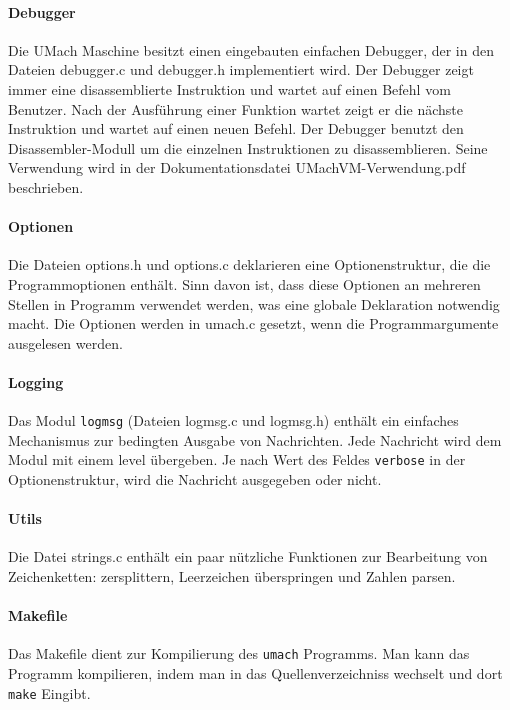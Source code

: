 \paragraph{Debugger}
Die UMach Maschine besitzt einen eingebauten einfachen Debugger, der in den
Dateien debugger.c und debugger.h implementiert wird. Der Debugger zeigt immer
eine disassemblierte Instruktion und wartet auf einen Befehl vom Benutzer. Nach
der Ausführung einer Funktion wartet zeigt er die nächste Instruktion und
wartet auf einen neuen Befehl. Der Debugger benutzt den Disassembler-Modull um
die einzelnen Instruktionen zu disassemblieren. Seine Verwendung wird in der
Dokumentationsdatei UMachVM-Verwendung.pdf beschrieben.

\paragraph{Optionen}
Die Dateien options.h und options.c deklarieren eine Optionenstruktur, die die
Programmoptionen enthält. Sinn davon ist, dass diese Optionen an mehreren
Stellen in Programm verwendet werden, was eine globale Deklaration notwendig
macht. Die Optionen werden in umach.c gesetzt, wenn die Programmargumente
ausgelesen werden.

\paragraph{Logging}
Das Modul \texttt{logmsg} (Dateien logmsg.c und logmsg.h) enthält ein einfaches
Mechanismus zur bedingten Ausgabe von Nachrichten. Jede Nachricht wird dem Modul
mit einem \glqq{}level\grqq{} übergeben. Je nach Wert des Feldes
\texttt{verbose} in der Optionenstruktur, wird die Nachricht ausgegeben oder
nicht.

\paragraph{Utils}
Die Datei strings.c enthält ein paar nützliche Funktionen zur Bearbeitung von
Zeichenketten: zersplittern, Leerzeichen überspringen und Zahlen parsen.

\paragraph{Makefile}
Das Makefile dient zur Kompilierung des \texttt{umach} Programms. Man kann das
Programm kompilieren, indem man in das Quellenverzeichniss wechselt und dort
\texttt{make} Eingibt.

